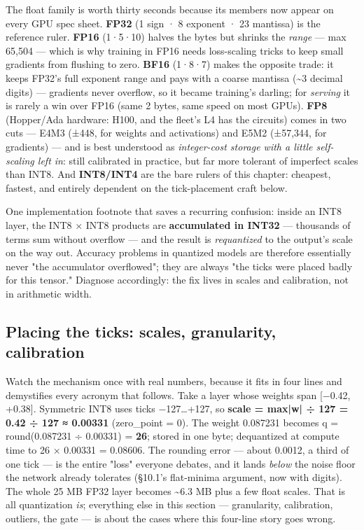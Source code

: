 The float family is worth thirty seconds because its members now appear on every GPU spec sheet. \textbf{FP32} (1 sign · 8 exponent · 23 mantissa) is the reference ruler. \textbf{FP16} (1·5·10) halves the bytes but shrinks the \textit{range} — max 65,504 — which is why training in FP16 needs loss-scaling tricks to keep small gradients from flushing to zero. \textbf{BF16} (1·8·7) makes the opposite trade: it keeps FP32's full exponent range and pays with a coarse mantissa (\textasciitilde{}3 decimal digits) — gradients never overflow, so it became training's darling; for \textit{serving} it is rarely a win over FP16 (same 2 bytes, same speed on most GPUs). \textbf{FP8} (Hopper/Ada hardware: H100, and the fleet's L4 has the circuits) comes in two cuts — E4M3 (±448, for weights and activations) and E5M2 (±57,344, for gradients) — and is best understood as \textit{integer-cost storage with a little self-scaling left in}: still calibrated in practice, but far more tolerant of imperfect scales than INT8. And \textbf{INT8/INT4} are the bare rulers of this chapter: cheapest, fastest, and entirely dependent on the tick-placement craft below.

One implementation footnote that saves a recurring confusion: inside an INT8 layer, the INT8 × INT8 products are \textbf{accumulated in INT32} — thousands of terms sum without overflow — and the result is \textit{requantized} to the output's scale on the way out. Accuracy problems in quantized models are therefore essentially never "the accumulator overflowed"; they are always "the ticks were placed badly for this tensor." Diagnose accordingly: the fix lives in scales and calibration, not in arithmetic width.

\subsection*{Placing the ticks: scales, granularity, calibration}

Watch the mechanism once with real numbers, because it fits in four lines and demystifies every acronym that follows. Take a layer whose weights span [−0.42, +0.38]. Symmetric INT8 uses ticks −127…+127, so \textbf{scale = max|w| ÷ 127 = 0.42 ÷ 127 ≈ 0.00331} (zero\_point = 0). The weight 0.087231 becomes q = round(0.087231 ÷ 0.00331) = \textbf{26}; stored in one byte; dequantized at compute time to 26 × 0.00331 = 0.08606. The rounding error — about 0.0012, a third of one tick — is the entire "loss" everyone debates, and it lands \textit{below} the noise floor the network already tolerates (§10.1's flat-minima argument, now with digits). The whole 25 MB FP32 layer becomes \textasciitilde{}6.3 MB plus a few float scales. That is all quantization \textit{is}; everything else in this section — granularity, calibration, outliers, the gate — is about the cases where this four-line story goes wrong.

